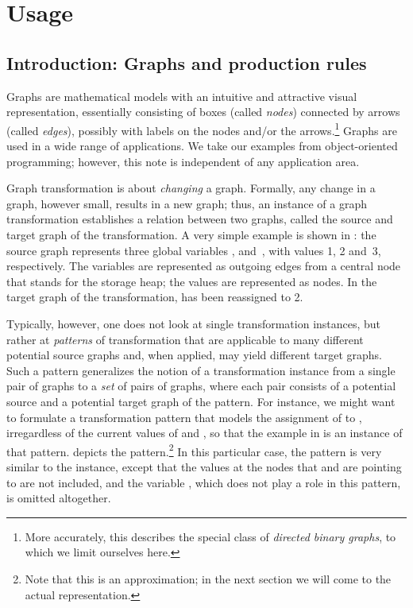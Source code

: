 \section{Usage}

\subsection{Introduction: Graphs and production rules}

Graphs are mathematical models with an intuitive and attractive visual
representation, essentially consisting of boxes (called \emph{nodes}) connected
by arrows (called \emph{edges}), possibly with labels on the nodes and/or the
arrows.\footnote{More accurately, this describes the special class of
\emph{directed binary graphs}, to which we limit ourselves here.} Graphs are
used in a wide range of applications. We take our examples from object-oriented
programming; however, this note is independent of any application area.

Graph transformation is about \emph{changing} a graph. Formally, any change in
a graph, however small, results in a new graph; thus, an instance of a graph
transformation establishes a relation between two graphs, called the source and
target graph of the transformation. A very simple example is shown in
: the source graph represents three global variables \xx,
\yy{} and~\zz, with values 1, 2 and~3, respectively. The variables are
represented as outgoing edges from a central node that stands for the storage
heap; the values are represented as nodes. In the target graph of the
transformation, \xx{} has been reassigned to 2.
%

Typically, however, one does not look at single transformation instances, but
rather at \emph{patterns} of transformation that are applicable to many
different potential source graphs and, when applied, may yield different target
graphs. Such a pattern generalizes the notion of a transformation instance from
a single pair of graphs to a \emph{set} of pairs of graphs, where each pair
consists of a potential source and a potential target graph of the pattern. For
instance, we might want to formulate a transformation pattern that models the
assignment of \yy{} to \xx, irregardless of the current values of
\xx{} and \yy, so that the example in  is an
instance of that pattern.  depicts the
pattern.\footnote{Note that this is an approximation; in the next section
  we will come to the actual representation.} In this particular case, the
pattern is very similar to the instance, except that the values at the nodes
that \xx{} and \yy{} are pointing to are not included, and the variable
\zz, which does not play a role in this pattern, is omitted altogether.
%

